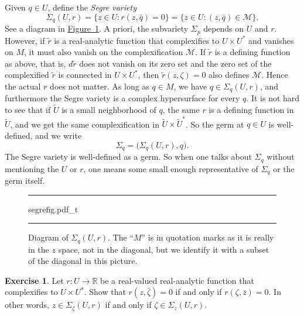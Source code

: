 \documentclass[12pt,openany]{book}
\newcommand{\R}{{\mathbb{R}}}
\newcommand{\sM}{{\mathscr{M}}}
\theoremstyle{plain}
\theoremstyle{remark}
\theoremstyle{definition}
\newenvironment{exbox}{%
    \def\FrameCommand{\vrule width 1pt \relax\hspace{10pt}}%
    \MakeFramed{\advance\hsize-\width\FrameRestore}%
}{%
    \endMakeFramed
}
\newenvironment{myfig}{%
\begin{figure}[h!t]
\noindent\rule{\textwidth}{0.5pt}\vspace{12pt}\par\centering}%
{\par\noindent\rule{\textwidth}{0.5pt}
\end{figure}}
\theoremstyle{exercise}
\newtheorem{exercise}{Exercise}[section]
\theoremstyle{example}
\newcommand{\figureref}[1]{\hyperref[#1]{Figure~\ref*{#1}}}
\begin{document}
Given $q \in U$,
define the \emph{Segre variety}
%
\begin{equation*}
\Sigma_q(U,r) =
\bigl\{ z \in U : r(z,\bar{q}) = 0 \bigr\} =
\bigl\{ z \in U : (z,\bar{q}) \in \sM \bigr\} .
\end{equation*}
See a diagram in \figureref{fig:segrefig}.
A priori, the subvariety $\Sigma_p$ depends on $U$ and $r$.
However, if $\widetilde{r}$ is a
real-analytic function that complexifies to $U \times U^*$
and vanishes on $M$, it must also vanish on the complexification $\sM$.
If $\widetilde{r}$ is a defining function as above,
that is, $d\widetilde{r}$ does not vanish on its zero set
and the zero set of the complexified $\widetilde{r}$ is connected
in $U \times U^*$, then $\widetilde{r}(z,\zeta) = 0$ also
defines $\sM$.
Hence the actual $r$ does not matter.
As long as $q \in M$, we have
$q \in \Sigma_q(U,r)$, and furthermore the
Segre variety is a complex hypersurface for every $q$.
It is not hard to see that
if $\widetilde{U}$ is a small neighborhood of $q$, the same $r$ is
a defining function in
$\widetilde{U}$, and we
get the same complexification in $\widetilde{U} \times \widetilde{U}^*$.
So the germ at $q \in U$ is well-defined, and we write
\begin{equation*}
\Sigma_q = \bigl( \Sigma_q(U,r) , q \bigr) .
\end{equation*}
The Segre variety is
well-defined as a germ.
So when one talks about $\Sigma_q$
without mentioning the $U$ or $r$, one means some small enough
representative of $\Sigma_q$ or the germ itself.

\begin{myfig}
\medskip
{segrefig.pdf_t}
\caption{Diagram of $\Sigma_q(U,r)$.
The ``$M$'' is in quotation marks as it is really in the $z$ space, not in
the diagonal, but we identify it with a subset of the diagonal in this
picture.\label{fig:segrefig}}
\end{myfig}

\begin{exbox}
\begin{exercise}
Let $r \colon U \to \R$ be a real-valued
real-analytic function that complexifies to
$U \times U^*$.  Show that
$r(z,\bar{\zeta}) = 0$
if and only if
$r(\zeta,\bar{z}) = 0$.  In other words,
$z \in \Sigma_{\zeta}(U,r)$ if and only if
$\zeta \in \Sigma_z(U,r)$.
\end{exercise}
\end{exbox}
\end{document}
